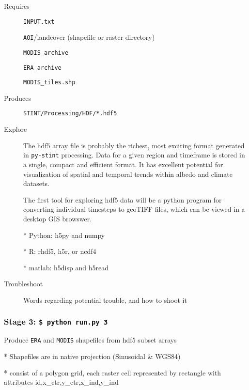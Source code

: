 \documentclass[twoside,a4paper]{refart}
\begin{document}
  \begin{description}
    \item [Requires]
     
          \texttt{INPUT.txt}
        
          \texttt{AOI}/landcover (shapefile or raster directory)
        
          \texttt{MODIS\_archive}
        
          \texttt{ERA\_archive}
        
          \texttt{MODIS\_tiles.shp}
  
  
    \item [Produces]
      \texttt{STINT/Processing/HDF/*.hdf5}
      

    \item [Explore]
      The hdf5 array file is probably the richest, most exciting format 
      generated in \texttt{py-stint} processing. Data for a given region 
      and timeframe is stored in a single, compact and efficient format. 
      It has excellent potential for visualization of spatial and temporal 
      trends within albedo and climate datasets. 
      
      The first tool for exploring hdf5 data will be a python program for
       converting individual timesteps to geoTIFF files, which can be 
       viewed in a desktop GIS browswer.
      
      
      * Python: h5py and numpy
      
      * R: rhdf5, h5r, or ncdf4 
      
      * matlab: h5disp and h5read

    \item [Troubleshoot]
      Words regarding potential trouble, and how to shoot it
  \end{description}


\subsubsection{\textbf{Stage 3:} \texttt{\$ python run.py 3}}
        Produce \texttt{ERA} and \texttt{MODIS} shapefiles from hdf5 subset arrays
        
        * Shapefiles are in native projection (Sinusoidal \& WGS84)
        
        * consist of a polygon grid, each raster cell represented by
          rectangle with attributes id,x\_ctr,y\_ctr,x\_ind,y\_ind
\end{document}

